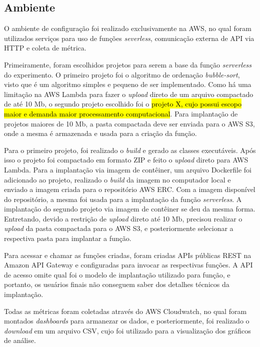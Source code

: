 \documentclass[conference]{IEEEtran}
\begin{document}
\subsection{Ambiente}
\label{subsec:environment}

O ambiente de configuração foi realizado exclusivamente na AWS, no qual foram utilizados serviços para uso de funções \textit{severless}, comunicação externa de API via HTTP e coleta de métrica. 

Primeiramente, foram escolhidos projetos para serem a base da função \textit{serverless} do experimento. O primeiro projeto foi o algoritmo de ordenação \textit{bubble-sort}, visto que é um algoritmo simples e pequeno de ser implementado.
Como há uma limitação na AWS Lambda para fazer o \textit{upload} direto de um arquivo compactado de até 10 Mb, o segundo projeto escolhido foi o \hl{projeto X, cujo possui escopo maior e demanda maior processamento computacional}. Para implantação de projetos maiores de 10 Mb, a pasta compactada deve ser enviada para o AWS S3, onde a mesma é armazenada e usada para a criação da função.

Para o primeiro projeto, foi realizado o \textit{build} e gerado as classes executáveis. Após isso o projeto foi compactado em formato ZIP e feito o \textit{upload} direto para AWS Lambda. Para a implantação via imagem de contêiner, um arquivo Dockerfile foi adicionado ao projeto, realizado o \textit{build} da imagem no computador local e enviado a imagem criada para o repositório AWS ERC. Com a imagem disponível do repositório, a mesma foi usada para a implantação da função \textit{serverless}.
A implantação do segundo projeto via imagem de contêiner se deu da mesma forma. Entretando, devido a restrição de \textit{upload} direto até 10 Mb, precisou realizar o \textit{upload} da pasta compactada para o AWS S3, e posteriormente selecionar a respectiva pasta para implantar a função. 

Para acessar e chamar as funções criadas, foram criadas APIs públicas REST na Amazon API Gateway e configuradas para invocar as respectivas funções. A API de acesso omite qual foi o modelo de implantação utilizado para função, e portanto, os usuários finais não conseguem saber dos detalhes técnicos da implantação.

Todas as métricas foram coletadas através do AWS Cloudwatch, no qual foram montados \textit{dashboards} para armanezar os dados, e posteriormente, foi realizado o \textit{download} em um arquivo CSV, cujo foi utilizado para a visualização dos gráficos de análise.
\end{document}
